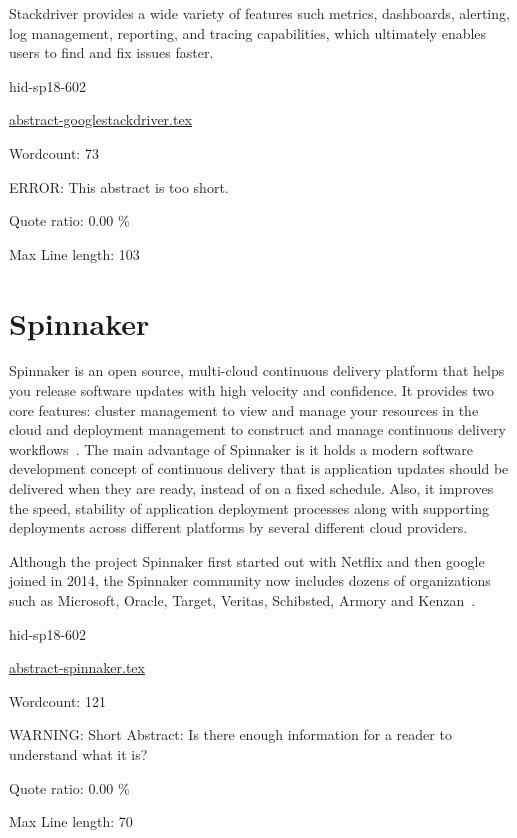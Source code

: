 Stackdriver provides a wide variety of features such metrics, dashboards, 
alerting, log management, reporting, and tracing capabilities, which 
ultimately enables users to find and fix issues faster\cite{hid-sp18-602-www-google-stackdriver-main}. 


\begin{IU}

hid-sp18-602

\href{https://github.com/cloudmesh-community/hid-sp18-602/blob/master//technology/abstract-googlestackdriver.tex}{abstract-googlestackdriver.tex}

 

Wordcount: 73

ERROR: This abstract is too short.


Quote ratio: 0.00 \%
 
Max Line length: 103
\end{IU}

\section{Spinnaker}

Spinnaker is an open source, multi-cloud continuous delivery platform
that helps you release software updates with high velocity and
confidence.  It provides two core features: cluster management to view
and manage your resources in the cloud and deployment management to
construct and manage continuous delivery
workflows~\cite{hid-sp18-602-www-spinnaker-io}. The main advantage of
Spinnaker is it holds a modern software development concept of
continuous delivery that is application updates should be delivered
when they are ready, instead of on a fixed schedule.  Also, it
improves the speed, stability of application deployment processes
along with supporting deployments across different platforms by
several different cloud providers.

Although the project Spinnaker first started out with Netflix and then
google joined in 2014, the Spinnaker community now includes dozens of
organizations such as Microsoft, Oracle, Target, Veritas,
Schibsted, Armory and Kenzan~\cite{hid-sp18-602-www-spinnaker-gc}.



\begin{IU}

hid-sp18-602

\href{https://github.com/cloudmesh-community/hid-sp18-602/blob/master//technology/abstract-spinnaker.tex}{abstract-spinnaker.tex}

 

Wordcount: 121

WARNING: Short Abstract: Is there enough information for a reader to understand what it is?


Quote ratio: 0.00 \%
 
Max Line length: 70
\end{IU}

